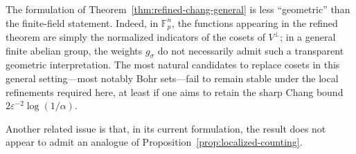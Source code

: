 \documentclass[11pt,reqno]{amsart}
\theoremstyle{plain}
\theoremstyle{remark}
\begin{document}
The formulation of Theorem~\ref{thm:refined-chang-general} is less ``geometric''
than the finite-field statement. Indeed, in $\mathbb F_p^n$, the functions appearing in
the refined theorem are simply the normalized indicators of the cosets of
$V^\perp$; in a general finite abelian group, the weights $g_\sigma$ do not necessarily admit such a transparent geometric interpretation. The most natural candidates to replace cosets in this general setting—most notably Bohr sets—fail to remain stable under the local refinements required here, at least if one aims to retain the sharp Chang bound $2\varepsilon^{-2}\log(1/\alpha)$.

Another related issue is that, in its current formulation, the result does not appear to admit an analogue of Proposition~\ref{prop:localized-counting}. 

\printbibliography
\end{document}
